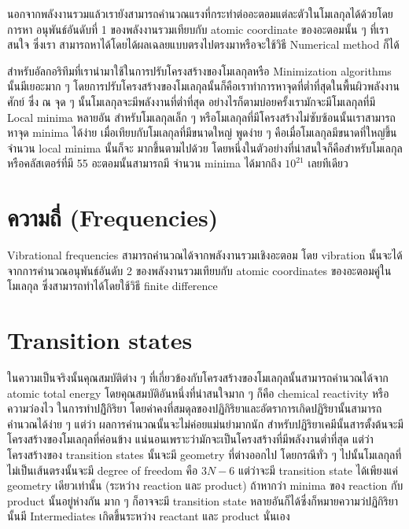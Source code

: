 นอกจากพลังงานรวมแล้วเรายังสามารถคำนวณแรงที่กระทำต่ออะตอมแต่ละตัวในโมเลกุลได้ด้วยโดยการหา%
อนุพันธ์อันดับที่ 1 ของพลังงานรวมเทียบกับ atomic coordinate ของอะตอมนั้น ๆ ที่เราสนใจ ซึ่งเรา%
สามารถหาได้โดยได้ผลเฉลยแบบตรงไปตรงมาหรือจะใช้วิธี Numerical method ก็ได้

สำหรับอัลกอริทึมที่เรานำมาใช้ในการปรับโครงสร้างของโมเลกุลหรือ Minimization algorithms 
นั้นมีเยอะมาก ๆ โดยการปรับโครงสร้างของโมเลกุลนั้นก็คือเราทำการหาจุดที่ต่ำที่สุดในพื้นผิวพลังงานศักย์%
ซึ่ง ณ จุด ๆ นั้นโมเลกุลจะมีพลังงานที่ต่ำที่สุด อย่างไรก็ตามบ่อยครั้งเรามักจะมีโมเลกุลที่มี Local minima 
หลายอัน สำหรับโมเลกุลเล็ก ๆ หรือโมเลกุลที่มีโครงสร้างไม่ซับซ้อนนั้นเราสามารถหาจุด minima ได้ง่าย%
เมื่อเทียบกับโมเลกุลที่มีขนาดใหญ่ พูดง่าย ๆ คือเมื่อโมเลกุลมีขนาดที่ใหญ่ขึ้นจำนวน local minima นั้นก็จะ%
มากขึ้นตามไปด้วย โดยหนึ่งในตัวอย่างที่น่าสนใจก็คือสำหรับโมเลกุลหรือคลัสเตอร์ที่มี 55 อะตอมนั้นสามารถมี%
จำนวน minima ได้มากถึง $10^{21}$ เลยทีเดียว

\section{ความถี่ (Frequencies)}

Vibrational frequencies สามารถคำนวณได้จากพลังงานรวมเชิงอะตอม โดย vibration นั้นจะได้%
จากการคำนวณอนุพันธ์อันดับ 2 ของพลังงานรวมเทียบกับ atomic coordinates ของอะตอมคู่ในโมเลกุล%
ซึ่งสามารถทำได้โดยใช้วิธี finite difference 

\section{Transition states}

ในความเป็นจริงนั้นคุณสมบัติต่าง ๆ ที่เกี่ยวข้องกับโครงสร้างของโมเลกุลนั้นสามารถคำนวณได้จาก atomic 
total energy โดยคุณสมบัติอันหนึ่งที่น่าสนใจมาก ๆ ก็คือ chemical reactivity หรือความว่องไว%
ในการทำปฏิิกิริยา โดยค่าคงที่สมดุลของปฏิกิริยาและอัตราการเกิดปฏิริยานั้นสามารถคำนวณได้ง่าย ๆ แต่ว่า%
ผลการคำนวณนั้นจะไม่ค่อยแม่นยำมากนัก สำหรับปฏิริยาเคมีนั้นสารตั้งต้นจะมีโครงสร้างของโมเลกุลที่ค่อนข้าง%
แน่นอนเพราะว่ามักจะเป็นโครงสร้างที่มีพลังงานต่ำที่สุด แต่ว่าโครงสร้างของ transition states 
นั้นจะมี geometry ที่ต่างออกไป โดยกรณีทั่ว ๆ ไปนั้นโมเลกุลที่ไม่เป็นเส้นตรงนั้นจะมี degree of 
freedom คือ $3N - 6$ แต่ว่าจะมี transition state ได้เพียงแค่ geometry เดียวเท่านั้น 
(ระหว่าง reaction และ product) ถ้าหากว่า minima ของ reaction กับ product นั้นอยู่ห่างกัน%
มาก ๆ ก็อาจจะมี transition state หลายอันก็ได้ซึ่งก็หมายความว่ปฏิกิริยานั้นมี Intermediates 
เกิดขึ้นระหว่าง reactant และ product นั่นเอง 


